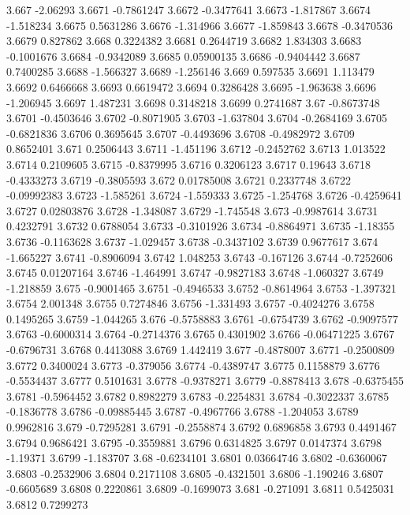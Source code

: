 3.667  -2.06293
3.6671  -0.7861247
3.6672  -0.3477641
3.6673  -1.817867
3.6674  -1.518234
3.6675  0.5631286
3.6676  -1.314966
3.6677  -1.859843
3.6678  -0.3470536
3.6679  0.827862
3.668  0.3224382
3.6681  0.2644719
3.6682  1.834303
3.6683  -0.1001676
3.6684  -0.9342089
3.6685  0.05900135
3.6686  -0.9404442
3.6687  0.7400285
3.6688  -1.566327
3.6689  -1.256146
3.669  0.597535
3.6691  1.113479
3.6692  0.6466668
3.6693  0.6619472
3.6694  0.3286428
3.6695  -1.963638
3.6696  -1.206945
3.6697  1.487231
3.6698  0.3148218
3.6699  0.2741687
3.67  -0.8673748
3.6701  -0.4503646
3.6702  -0.8071905
3.6703  -1.637804
3.6704  -0.2684169
3.6705  -0.6821836
3.6706  0.3695645
3.6707  -0.4493696
3.6708  -0.4982972
3.6709  0.8652401
3.671  0.2506443
3.6711  -1.451196
3.6712  -0.2452762
3.6713  1.013522
3.6714  0.2109605
3.6715  -0.8379995
3.6716  0.3206123
3.6717  0.19643
3.6718  -0.4333273
3.6719  -0.3805593
3.672  0.01785008
3.6721  0.2337748
3.6722  -0.09992383
3.6723  -1.585261
3.6724  -1.559333
3.6725  -1.254768
3.6726  -0.4259641
3.6727  0.02803876
3.6728  -1.348087
3.6729  -1.745548
3.673  -0.9987614
3.6731  0.4232791
3.6732  0.6788054
3.6733  -0.3101926
3.6734  -0.8864971
3.6735  -1.18355
3.6736  -0.1163628
3.6737  -1.029457
3.6738  -0.3437102
3.6739  0.9677617
3.674  -1.665227
3.6741  -0.8906094
3.6742  1.048253
3.6743  -0.167126
3.6744  -0.7252606
3.6745  0.01207164
3.6746  -1.464991
3.6747  -0.9827183
3.6748  -1.060327
3.6749  -1.218859
3.675  -0.9001465
3.6751  -0.4946533
3.6752  -0.8614964
3.6753  -1.397321
3.6754  2.001348
3.6755  0.7274846
3.6756  -1.331493
3.6757  -0.4024276
3.6758  0.1495265
3.6759  -1.044265
3.676  -0.5758883
3.6761  -0.6754739
3.6762  -0.9097577
3.6763  -0.6000314
3.6764  -0.2714376
3.6765  0.4301902
3.6766  -0.06471225
3.6767  -0.6796731
3.6768  0.4413088
3.6769  1.442419
3.677  -0.4878007
3.6771  -0.2500809
3.6772  0.3400024
3.6773  -0.379056
3.6774  -0.4389747
3.6775  0.1158879
3.6776  -0.5534437
3.6777  0.5101631
3.6778  -0.9378271
3.6779  -0.8878413
3.678  -0.6375455
3.6781  -0.5964452
3.6782  0.8982279
3.6783  -0.2254831
3.6784  -0.3022337
3.6785  -0.1836778
3.6786  -0.09885445
3.6787  -0.4967766
3.6788  -1.204053
3.6789  0.9962816
3.679  -0.7295281
3.6791  -0.2558874
3.6792  0.6896858
3.6793  0.4491467
3.6794  0.9686421
3.6795  -0.3559881
3.6796  0.6314825
3.6797  0.0147374
3.6798  -1.19371
3.6799  -1.183707
3.68  -0.6234101
3.6801  0.03664746
3.6802  -0.6360067
3.6803  -0.2532906
3.6804  0.2171108
3.6805  -0.4321501
3.6806  -1.190246
3.6807  -0.6605689
3.6808  0.2220861
3.6809  -0.1699073
3.681  -0.271091
3.6811  0.5425031
3.6812  0.7299273
